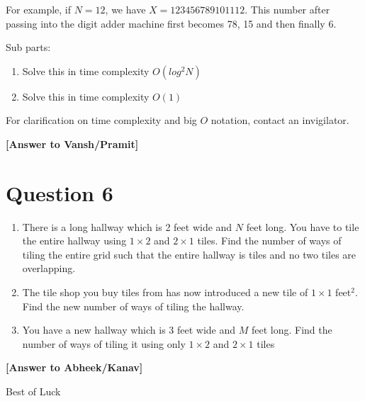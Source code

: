 \documentclass[a4paper,12pt]{article}
\begin{document}
For example, if $N = 12$, we have $X = 123456789101112$. This number after passing into the digit adder machine first becomes 78, 15 and then finally 6.

\noindent
Sub parts:
\begin{enumerate}[label=\alph*)]
    \item Solve this in time complexity $O(log^2N)$
    \item Solve this in time complexity $O(1)$
\end{enumerate}
For clarification on time complexity and big $O$ notation, contact an invigilator.

\textbf{[Answer to Vansh/Pramit]}

\hrulefill

\section*{Question 6}
\begin{enumerate}[label=\alph*)]
    \item There is a long hallway which is 2 feet wide and $N$ feet long. You have to tile the entire hallway using $1 \times 2$ and $2 \times 1$ tiles. Find the number of ways of tiling the entire grid such that the entire hallway is tiles and no two tiles are overlapping.
    \item The tile shop you buy tiles from has now introduced a new tile of $1 \times 1$ feet$^2$. Find the new number of ways of tiling the hallway.
    \item You have a new hallway which is 3 feet wide and $M$ feet long. Find the number of ways of tiling it using only $1 \times 2$ and $2 \times 1$ tiles
\end{enumerate}

\textbf{[Answer to Abheek/Kanav]}

\hrulefill

\begin{center}
    Best of Luck
\end{center}
\end{document}
